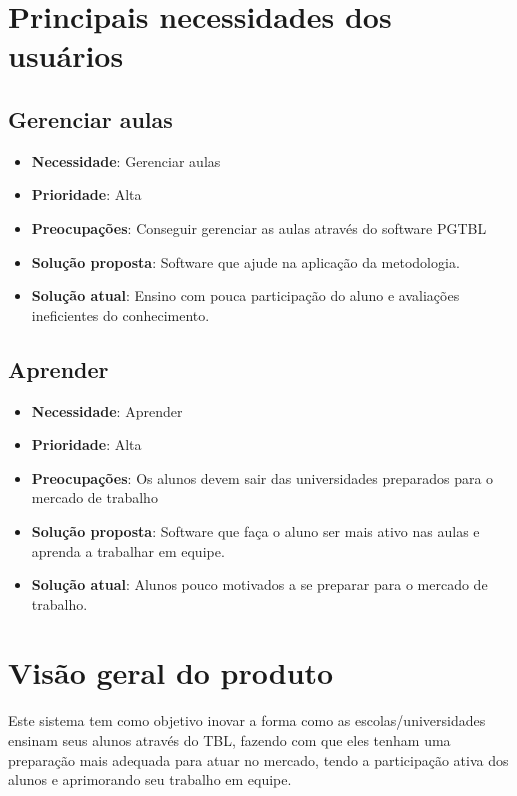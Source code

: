 \section{Principais necessidades dos usuários}

\subsection{Gerenciar aulas}

\begin{itemize}
  \item \textbf{Necessidade}: Gerenciar aulas
  \item \textbf{Prioridade}: Alta
  \item \textbf{Preocupações}: Conseguir gerenciar as aulas através do software PGTBL
  \item \textbf{Solução proposta}: Software que ajude na aplicação da metodologia.
  \item \textbf{Solução atual}: Ensino com pouca participação do aluno e avaliações ineficientes do conhecimento.
\end{itemize}

\subsection{Aprender}

\begin{itemize}
  \item \textbf{Necessidade}: Aprender
  \item \textbf{Prioridade}: Alta
  \item \textbf{Preocupações}: Os alunos devem sair das universidades preparados para o mercado de trabalho
  \item \textbf{Solução proposta}: Software que faça o aluno ser mais ativo nas aulas e aprenda a trabalhar em equipe.
  \item \textbf{Solução atual}: Alunos pouco motivados a se preparar para o mercado de trabalho.
\end{itemize}

\section{Visão geral do produto}

Este sistema tem como objetivo inovar a forma como as escolas/universidades ensinam seus alunos através do TBL, fazendo com que eles tenham uma preparação mais adequada para atuar no mercado, tendo a participação ativa dos alunos e aprimorando seu trabalho em equipe.


